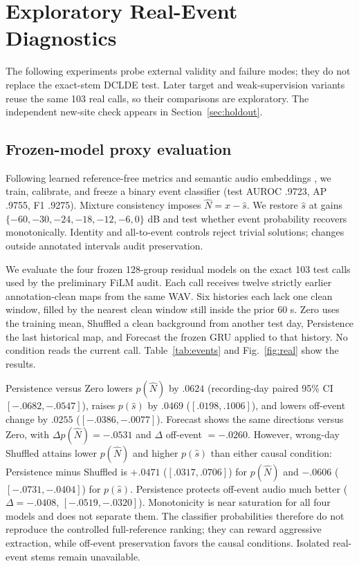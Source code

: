 \documentclass[conference]{IEEEtran}
\begin{document}
\section{Exploratory Real-Event Diagnostics}
The following experiments probe external validity and failure modes; they do
not replace the exact-stem DCLDE test. Later target and weak-supervision
variants reuse the same 103 real calls, so their comparisons are exploratory.
The independent new-site check appears in Section~\ref{sec:holdout}.

\subsection{Frozen-model proxy evaluation}
Following learned reference-free metrics \cite{kilgour2019fad,grais2019referenceless}
and semantic audio embeddings \cite{wu2023clap,xiao2024clapscore}, we train,
calibrate, and freeze a binary event classifier (test AUROC .9723, AP .9755,
F1 .9275).  Mixture consistency imposes $\hat N=x-\hat s$.  We restore
$\hat s$ at gains $\{-60,-30,-24,-18,-12,-6,0\}$ dB and test whether event
probability recovers monotonically.  Identity and all-to-event controls reject
trivial solutions; changes outside annotated intervals audit preservation.

We evaluate the four frozen 128-group residual models on the exact 103 test
calls used by the preliminary FiLM audit. Each call receives twelve strictly
earlier annotation-clean maps from the same WAV. Six histories each lack one
clean window, filled by the nearest clean window still inside the prior 60 s.
Zero uses the training mean, Shuffled a clean background from another test
day, Persistence the last historical map, and Forecast the frozen GRU applied
to that history. No condition reads the current call. Table~\ref{tab:events}
and Fig.~\ref{fig:real} show the results.

Persistence versus Zero lowers $p(\hat N)$ by $.0624$ (recording-day paired
95\% CI $[-.0682,-.0547]$), raises $p(\hat s)$ by $.0469$
($[.0198,.1006]$), and lowers off-event change by $.0255$
($[-.0386,-.0077]$). Forecast shows the same directions versus Zero, with
$\Delta p(\hat N)=-.0531$ and $\Delta$ off-event $=-.0260$.
However, wrong-day Shuffled attains lower $p(\hat N)$ and higher $p(\hat s)$
than either causal condition: Persistence minus Shuffled is $+.0471$
($[.0317,.0706]$) for $p(\hat N)$ and $-.0606$ ($[-.0731,-.0404]$) for
$p(\hat s)$. Persistence protects off-event audio much better
($\Delta=-.0408$, $[-.0519,-.0320]$). Monotonicity is near saturation for
all four models and does not separate them. The classifier probabilities
therefore do not reproduce the controlled full-reference ranking; they can
reward aggressive extraction, while off-event preservation favors the causal
conditions. Isolated real-event stems remain unavailable.
\end{document}
